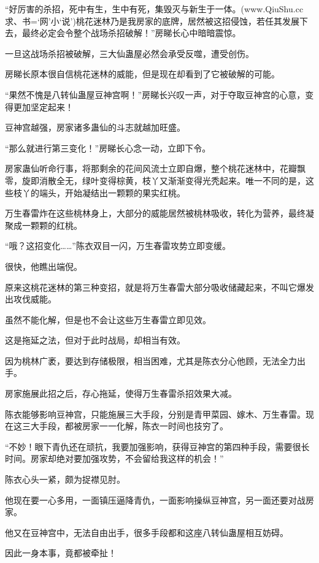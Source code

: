 
\begin{this_body}

“好厉害的杀招，死中有生，生中有死，集毁灭与新生于一体。(www.QiuShu.cc 求、书=‘网’小‘说’)桃花迷林乃是我房家的底牌，居然被这招侵蚀，若任其发展下去，最终必定会令整个战场杀招破解！”房睇长心中暗暗震惊。

一旦这战场杀招被破解，三大仙蛊屋必然会承受反噬，遭受创伤。

房睇长原本很自信桃花迷林的威能，但是现在却看到了它被破解的可能。

“果然不愧是八转仙蛊屋豆神宫啊！”房睇长兴叹一声，对于夺取豆神宫的心意，变得更加坚定起来！

豆神宫越强，房家诸多蛊仙的斗志就越加旺盛。

“那么就进行第三变化！”房睇长心念一动，立即下令。

房家蛊仙听命行事，将那剩余的花间风流士立即自爆，整个桃花迷林中，花瓣飘零，旋即消散全无，绿叶变得棕黄，枝丫又渐渐变得光秃起来。唯一不同的是，这些枝丫的端头，开始凝结出一颗颗的果实红桃。

万生春雷炸在这些桃林身上，大部分的威能居然被桃林吸收，转化为营养，最终凝聚成一颗颗的红桃。

“哦？这招变化……”陈衣双目一闪，万生春雷攻势立即变缓。

很快，他瞧出端倪。

原来这桃花迷林的第三种变招，就是将万生春雷大部分吸收储藏起来，不叫它爆发出攻伐威能。

虽然不能化解，但是也不会让这些万生春雷立即见效。

这是拖延之法，但对于此时战局，却相当有效。

因为桃林广袤，要达到存储极限，相当困难，尤其是陈衣分心他顾，无法全力出手。

房家施展此招之后，存心拖延，使得万生春雷杀招效果大减。

陈衣能够影响豆神宫，只能施展三大手段，分别是青甲菜园、嫁木、万生春雷。现在这三大手段，都被房家一一化解，陈衣一时间也技穷了。

“不妙！眼下青仇还在顽抗，我要加强影响，获得豆神宫的第四种手段，需要很长时间。房家却绝对要加强攻势，不会留给我这样的机会！”

陈衣心头一紧，颇为捉襟见肘。

他现在要一心多用，一面镇压逼降青仇，一面影响操纵豆神宫，另一面还要对战房家。

他又在豆神宫中，无法自由出手，很多手段都和这座八转仙蛊屋相互妨碍。

因此一身本事，竟都被牵扯！


\end{this_body}
